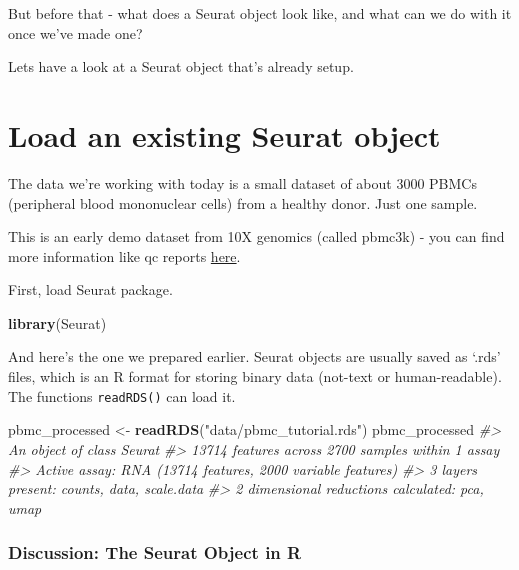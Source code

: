 \documentclass[
]{book}
\newenvironment{Shaded}{\begin{snugshade}}{\end{snugshade}}
\newcommand{\CommentTok}[1]{\textcolor[rgb]{0.56,0.35,0.01}{\textit{#1}}}
\newcommand{\FunctionTok}[1]{\textcolor[rgb]{0.13,0.29,0.53}{\textbf{#1}}}
\newcommand{\NormalTok}[1]{#1}
\newcommand{\OtherTok}[1]{\textcolor[rgb]{0.56,0.35,0.01}{#1}}
\newcommand{\StringTok}[1]{\textcolor[rgb]{0.31,0.60,0.02}{#1}}
\begin{document}
But before that - what does a Seurat object look like, and what can we do with it once we've made one?

Lets have a look at a Seurat object that's already setup.

\hypertarget{load-an-existing-seurat-object}{%
\section{Load an existing Seurat object}\label{load-an-existing-seurat-object}}

The data we're working with today is a small dataset of about 3000 PBMCs (peripheral blood mononuclear cells) from a healthy donor. Just one sample.

This is an early demo dataset from 10X genomics (called pbmc3k) - you can find more information like qc reports \href{https://www.10xgenomics.com/resources/datasets/3-k-pbm-cs-from-a-healthy-donor-1-standard-1-1-0}{here}.

First, load Seurat package.

\begin{Shaded}
\begin{Highlighting}[]
\FunctionTok{library}\NormalTok{(Seurat)}
\end{Highlighting}
\end{Shaded}

And here's the one we prepared earlier. Seurat objects are usually saved as `.rds' files, which is an R format for storing binary data (not-text or human-readable). The functions \texttt{readRDS()} can load it.

\begin{Shaded}
\begin{Highlighting}[]
\NormalTok{pbmc\_processed }\OtherTok{\textless{}{-}} \FunctionTok{readRDS}\NormalTok{(}\StringTok{"data/pbmc\_tutorial.rds"}\NormalTok{)}
\NormalTok{pbmc\_processed}
\CommentTok{\#\textgreater{} An object of class Seurat }
\CommentTok{\#\textgreater{} 13714 features across 2700 samples within 1 assay }
\CommentTok{\#\textgreater{} Active assay: RNA (13714 features, 2000 variable features)}
\CommentTok{\#\textgreater{}  3 layers present: counts, data, scale.data}
\CommentTok{\#\textgreater{}  2 dimensional reductions calculated: pca, umap}
\end{Highlighting}
\end{Shaded}

\hypertarget{discussion-the-seurat-object-in-r}{%
\subsubsection*{Discussion: The Seurat Object in R}\label{discussion-the-seurat-object-in-r}}
\end{document}
